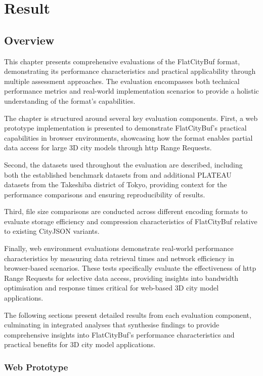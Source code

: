 \chapter{Result}
\label{chp:result}
\section{Overview}
\label{result:overview}
This chapter presents comprehensive evaluations of the FlatCityBuf format, demonstrating its performance characteristics and practical applicability through multiple assessment approaches. The evaluation encompasses both technical performance metrics and real-world implementation scenarios to provide a holistic understanding of the format's capabilities.

The chapter is structured around several key evaluation components. First, a web prototype implementation is presented to demonstrate FlatCityBuf's practical capabilities in browser environments, showcasing how the format enables partial data access for large 3D city models through \ac{http} Range Requests.

Second, the datasets used throughout the evaluation are described, including both the established benchmark datasets from \citet{ledoux_2024} and additional PLATEAU datasets from the Takeshiba district of Tokyo, providing context for the performance comparisons and ensuring reproducibility of results.

Third, file size comparisons are conducted across different encoding formats to evaluate storage efficiency and compression characteristics of FlatCityBuf relative to existing CityJSON variants.

Finally, web environment evaluations demonstrate real-world performance characteristics by measuring data retrieval times and network efficiency in browser-based scenarios. These tests specifically evaluate the effectiveness of \ac{http} Range Requests for selective data access, providing insights into bandwidth optimisation and response times critical for web-based 3D city model applications.

The following sections present detailed results from each evaluation component, culminating in integrated analyses that synthesise findings to provide comprehensive insights into FlatCityBuf's performance characteristics and practical benefits for 3D city model applications.

\subsection{Web Prototype}
\label{result:web_prototype}

